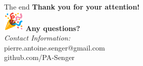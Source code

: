 \documentclass[10pt]{beamer}
\begin{document}
\begin{frame}{The end}
	\Large
	\centering
	\textbf{Thank you for your attention!} \\
	\vspace{1em}
	\includegraphics[height=1cm]{images/party-emoji.png}
	\vspace{1em}
	\textbf{Any questions?} \\
	\vspace{2em}
	\small
	\textit{Contact Information:} \\
	pierre.antoine.senger@gmail.com \\
	github.com/PA-Senger
\end{frame}

\nocite{*}


\end{document}
